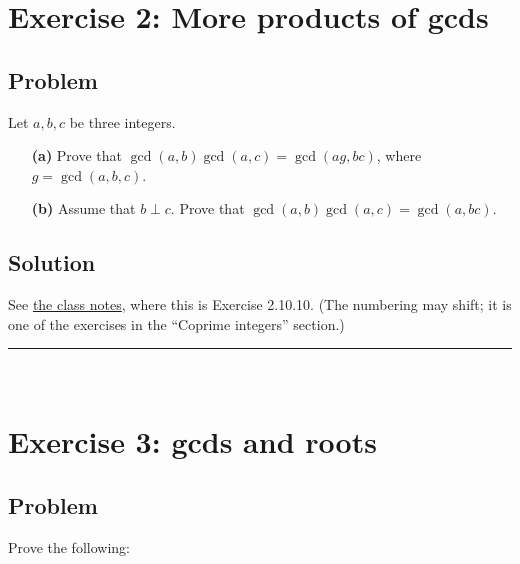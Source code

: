 \documentclass[paper=a4, fontsize=12pt]{scrartcl} %
\newcommand{\tup}[1]{\left( #1 \right)}
\newcommand{\horrule}[1]{\rule{\linewidth}{#1}} %
\theoremstyle{plainsl}
\theoremstyle{definition}
\theoremstyle{remark}
\begin{document}
\section{Exercise 2: More products of gcds}

\subsection{Problem}

Let $a, b, c$ be three integers.

\begin{enumerate}

\item[\textbf{(a)}]
Prove that
$\gcd\tup{a, b} \gcd\tup{a, c}
= \gcd\tup{ag, bc}$,
where $g = \gcd\tup{a, b, c}$.

\item[\textbf{(b)}]
Assume that $b \perp c$.
Prove that
$\gcd\tup{a, b} \gcd\tup{a, c} = \gcd\tup{a, bc}$.

\end{enumerate}

\subsection{Solution}

See
\href{http://www-users.math.umn.edu/~dgrinber/19s/notes.pdf}{the class notes},
where this is Exercise 2.10.10. (The numbering may shift; it is one of the
exercises in the
``Coprime integers''
section.)

\horrule{0.3pt} \\[0.4cm]

\section{Exercise 3: gcds and roots}

\subsection{Problem}

Prove the following:
\end{document}

